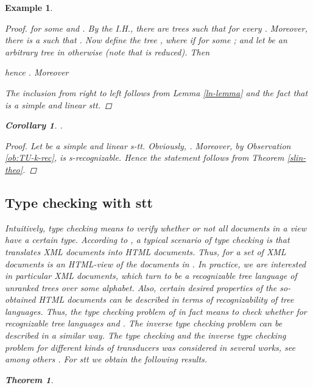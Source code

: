 \documentclass[10pt]{scrartcl}
\newtheorem{ex}[df]{Example}
\newtheorem{theo}[df]{Theorem}
\newtheorem{cor}[df]{Corollary}
\begin{document}
\begin{ex}
\begin{proof}
for some  and . By the I.H., there are trees  
such that  for every . Moreover, there is a  such that . Now define the tree , where  if  for some ; and let  be an arbitrary tree in  otherwise (note that  is reduced). Then 

hence .  Moreover



The inclusion from right to left follows from Lemma \ref{ln-lemma} and the fact that  is a simple and linear stt.
\end{proof}

\begin{cor} \rm \label{range-lemma}.
\end{cor}
\begin{proof}  Let  be a simple and linear s-tt. Obviously, . Moreover, by Observation \ref{ob:TU-k-rec},  is s-recognizable. Hence the statement follows from Theorem \ref{slin-theo}.
\end{proof}

\subsection{Type checking with stt}

Intuitively, type checking means to verify whether or not all documents in a view have a certain type. According to \cite{engman03}, a typical scenario of type checking is that   translates XML documents into HTML documents. Thus, for a set  of XML documents  is an HTML-view of the documents in . In practice, we are interested in particular XML documents, which turn to be a recognizable tree language of unranked trees over some alphabet. 
Also, certain desired properties of the so-obtained HTML documents can be described in terms of recognizability of tree languages. Thus, the type checking problem of  in fact means to check whether  for recognizable   tree languages  and . The inverse type checking problem can be described in a similar way. The type checking and the inverse type checking problem for different kinds of transducers was considered in several works, see among others \cite{milsucvia03,alomilnevsucvia03,engman03,manberpersei05}.
For stt we obtain the following results.

\begin{theo}\label{thm:type-checking} 

\


\end{theo}
\end{ex}
\end{document}
